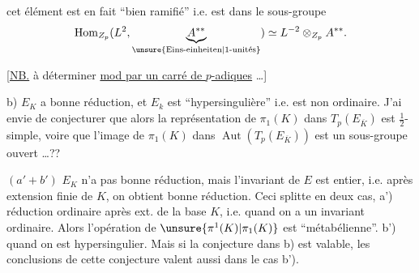 cet  élément est en fait ``bien ramifié'' i.e. est dans le sous-groupe
\[
\operatorname{Hom}_{Z_p}(L^2,\underbrace{A^{**}}_{\text{\unsure{Eins-einheiten|1-unités}}})\simeq L^{-2}\otimes_{Z_p}A^{**}.
\]

[\uline{NB.}  à déterminer \uline{mod   par un carré de   $p$-adiques} \dots]


b) $E_K$ a bonne réduction, et $E_k$ est ``hypersingulière'' i.e. est non ordinaire. J'ai envie de conjecturer que alors la représentation de $\pi_1(K)$ dans $T_p(E_{\overline K})$ est $\frac12$-simple, voire que l'image de $\pi_1(K)$ dans $\operatorname{Aut}(T_p(E_{\overline K}))$ est un sous-groupe ouvert \dots ??

$(a'+b')$ $E_K$ n'a pas  bonne réduction, mais l'invariant de $E$ est entier, i.e. après extension finie de $K$, on obtient bonne réduction. Ceci splitte en deux cas, a') réduction ordinaire après ext. de la base $K$, i.e. quand on a un invariant ordinaire. Alors l'opération de $\unsure{\pi^1(K)|\pi_1(K)}$ est ``métabélienne''. b') quand on est hypersingulier. Mais  si la conjecture dans b) est valable, les conclusions de cette conjecture valent aussi dans le cas b').
